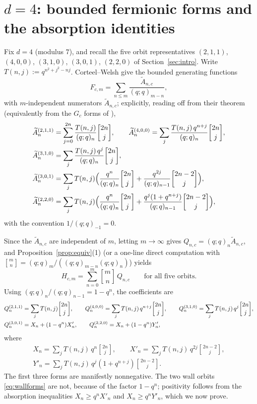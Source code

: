 \documentclass[11pt]{article}
\newcommand{\qbin}[2]{\genfrac{[}{]}{0pt}{}{#1}{#2}}
\newcommand{\poch}[1]{(q;q)_{#1}}
\begin{document}
\section{$d=4$: bounded fermionic forms and the absorption identities}
\label{sec:d4}

Fix $d=4$ (modulus $7$), and recall the five orbit representatives
$(2,1,1)$, $(4,0,0)$, $(3,1,0)$, $(3,0,1)$, $(2,2,0)$ of
Section~\ref{sec:intro}. Write $T(n,j):=q^{n^2+j^2-nj}$. Corteel--Welsh
\cite[Theorem~1.2]{CW19} give the bounded generating functions
\[
F_{c,m}=\sum_{n\le m}\frac{\widetilde A_{n,c}}{\poch{m-n}},
\]
with $m$-independent numerators $\widetilde A_{n,c}$; explicitly, reading
off from their theorem (equivalently from the $G_c$ forms of
\cite[Theorem~3.2]{CW19}),
\begin{align*}
\widetilde A_n^{(2,1,1)}&=\sum_{j=0}^{2n}\frac{T(n,j)}{\poch{n}}
\qbin{2n}{j},\qquad
\widetilde A_n^{(4,0,0)}=\sum_{j}\frac{T(n,j)\,q^{n+j}}{\poch{n}}
\qbin{2n}{j},\\
\widetilde A_n^{(3,1,0)}&=\sum_{j}\frac{T(n,j)\,q^{j}}{\poch{n}}
\qbin{2n}{j},\\
\widetilde A_n^{(3,0,1)}&=\sum_{j}T(n,j)\Bigl(
\frac{q^{n}}{\poch{n}}\qbin{2n}{j}
+\frac{q^{2j}}{\poch{n-1}}\qbin{2n-2}{j}\Bigr),\\
\widetilde A_n^{(2,2,0)}&=\sum_{j}T(n,j)\Bigl(
\frac{q^{n}}{\poch{n}}\qbin{2n}{j}
+\frac{q^{j}(1+q^{n+j})}{\poch{n-1}}\qbin{2n-2}{j}\Bigr),
\end{align*}
with the convention $1/\poch{-1}=0$.

Since the $\widetilde A_{n,c}$ are independent of $m$, letting
$m\to\infty$ gives $Q_{n,c}=\poch{n}\widetilde A_{n,c}$, and
Proposition~\ref{prop:equiv}(1) (or a one-line direct computation with
$\qbin{m}{n}=\poch{m}/(\poch{m-n}\poch{n})$) yields
\begin{equation}\label{eq:bffd4}
H_{c,m}=\sum_{n=0}^{m}\qbin{m}{n}\,Q_{n,c}
\qquad\text{for all five orbits.}
\end{equation}
Using $\poch{n}/\poch{n-1}=1-q^n$, the coefficients are
\begin{align}
Q_n^{(2,1,1)}&=\sum_{j}T(n,j)\qbin{2n}{j},\qquad
Q_n^{(4,0,0)}=\sum_{j}T(n,j)\,q^{n+j}\qbin{2n}{j},\qquad
Q_n^{(3,1,0)}=\sum_{j}T(n,j)\,q^{j}\qbin{2n}{j},
\notag\\
Q_n^{(3,0,1)}&=X_n+(1-q^n)X'_n,\qquad
Q_n^{(2,2,0)}=X_n+(1-q^n)Y'_n,
\label{eq:wallforms}
\end{align}
where
\begin{gather*}
X_n=\sum_jT(n,j)\,q^n\qbin{2n}{j},\qquad
X'_n=\sum_jT(n,j)\,q^{2j}\qbin{2n-2}{j},\\
Y'_n=\sum_jT(n,j)\,q^{j}(1+q^{n+j})\qbin{2n-2}{j}.
\end{gather*}
The first three forms are manifestly nonnegative. The two wall orbits
\eqref{eq:wallforms} are not, because of the factor $1-q^n$; positivity
follows from the absorption inequalities $X_n\ge q^nX'_n$ and
$X_n\ge q^nY'_n$, which we now prove.
\end{document}
